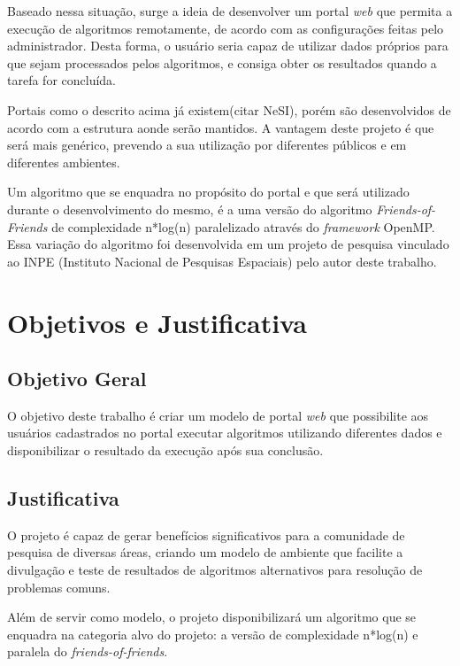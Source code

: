 \documentclass[tg]{mdtufsm}
\begin{document}
Baseado nessa situação, surge a ideia de desenvolver um portal \emph{web} que permita a execução de algoritmos remotamente, de acordo com as configurações feitas pelo administrador. Desta forma, o usuário seria capaz de utilizar dados próprios para que sejam processados pelos algoritmos, e consiga obter os resultados quando a tarefa for concluída.

Portais como o descrito acima já existem(citar NeSI), porém são desenvolvidos de acordo com a estrutura aonde serão mantidos. A vantagem deste projeto é que será mais genérico, prevendo a sua utilização por diferentes públicos e em diferentes ambientes.

Um algoritmo que se enquadra no propósito do portal e que será utilizado durante o desenvolvimento do mesmo, é a uma versão do algoritmo \emph{Friends-of-Friends}\cite{FoF} de complexidade n*log(n) paralelizado através do \emph{framework} OpenMP. Essa variação do algoritmo foi desenvolvida em um projeto de pesquisa vinculado ao INPE (Instituto Nacional de Pesquisas Espaciais) pelo autor deste trabalho.

\section{Objetivos e Justificativa}

\subsection{Objetivo Geral}

O objetivo deste trabalho é criar um modelo de portal \emph{web} que possibilite aos usuários cadastrados no portal executar algoritmos utilizando diferentes dados e disponibilizar o resultado da execução após sua conclusão.

\subsection{Justificativa}

O projeto é capaz de gerar benefícios significativos para a comunidade de pesquisa de diversas áreas, criando um modelo de ambiente que facilite a divulgação e teste de resultados de algoritmos alternativos para resolução de problemas comuns.

Além de servir como modelo, o projeto disponibilizará um algoritmo que se enquadra na categoria alvo do projeto: a versão de complexidade n*log(n) e paralela do \emph{friends-of-friends}.
\end{document}
